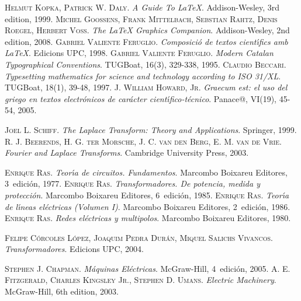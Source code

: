 \begin{thebibliography}{99}


     \textsc{Helmut Kopka, Patrick W. Daly}. \textsl{A Guide To \LaTeX}.  Addison-Wesley, 3rd edition, 1999.
     \textsc{Michel Goossens, Frank Mittelbach, Sebstian Rahtz, Denis Roegel, Herbert Vo{\ss}}. \textsl{The \LaTeX{} Graphics Companion}.  Addison-Wesley, 2nd edition, 2008.
     \textsc{Gabriel Valiente Feruglio}. \textsl{Composici\'{o} de textos cient\'{\i}fics amb \LaTeX}.  Edicions UPC, 1998.
     \textsc{Gabriel Valiente Feruglio}. \textsl{Modern Catalan Typographical Conventions}.  TUGBoat, 16(3), 329-338, 1995.
     \textsc{Claudio Beccari}. \textsl{Typesetting mathematics for science and technology according to ISO 31/XL}.  TUGBoat, 18(1), 39-48, 1997.
     \textsc{J. William Howard, Jr}. \textsl{Graecum est: el uso del griego en textos electr\'{o}nicos de car\'{a}cter cient\'{\i}fico-t\'{e}cnico}.  Panace@, VI(19), 45-54, 2005.


     \textsc{Joel L. Schiff}. \textsl{The Laplace Transform: Theory and Applications}.  Springer, 1999.
     \textsc{R. J. Beerends, H. G. ter Morsche, J. C. van den Berg, E. M. van de Vrie}. \textsl{Fourier and Laplace Transforms}.  Cambridge University Press, 2003.

     \textsc{Enrique Ras}. \textsl{Teor\'{\i}a de circuitos. Fundamentos}.  Marcombo Boixareu Editores, 3\textordfeminine\ edici\'{o}n, 1977.
     \textsc{Enrique Ras}. \textsl{Transformadores. De potencia, medida y protecci\'{o}n}.  Marcombo Boixareu Editores, 6\textordfeminine\ edici\'{o}n, 1985.
     \textsc{Enrique Ras}. \textsl{Teor\'{\i}a de l\'{\i}neas el\'{e}ctricas (Volumen I)}.  Marcombo Boixareu Editores, 2\textordfeminine\ edici\'{o}n, 1986.
     \textsc{Enrique Ras}. \textsl{Redes el\'{e}ctricas y multipolos}.  Marcombo Boixareu Editores, 1980.

     \textsc{Felipe C\'{o}rcoles L\'{o}pez, Joaquim Pedra Dur\'{a}n, Miquel Salichs Vivancos}. \textsl{Transformadores}.  Edicions UPC, 2004.

     \textsc{Stephen J. Chapman}. \textsl{M\'{a}quinas El\'{e}ctricas}.  McGraw-Hill, 4\textordfeminine\ edici\'{o}n, 2005.
     \textsc{A. E. Fitzgerald, Charles Kingsley Jr., Stephen D. Umans}. \textsl{Electric Machinery}.  McGraw-Hill, 6th edition, 2003.


\end{thebibliography}
